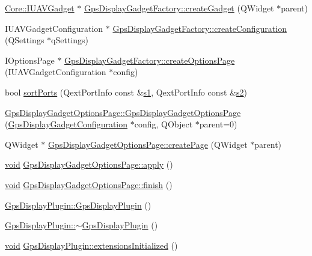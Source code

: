 \begin{DoxyCompactItemize}
\item 
\hyperlink{class_core_1_1_i_u_a_v_gadget}{\-Core\-::\-I\-U\-A\-V\-Gadget} $\ast$ \hyperlink{group___g_p_s_gadget_plugin_gabda9dce6df1e2608e4450ae1573588df}{\-Gps\-Display\-Gadget\-Factory\-::create\-Gadget} (\-Q\-Widget $\ast$parent)
\item 
\-I\-U\-A\-V\-Gadget\-Configuration $\ast$ \hyperlink{group___g_p_s_gadget_plugin_gae66522a3ebff0d0efac6e71ddf729657}{\-Gps\-Display\-Gadget\-Factory\-::create\-Configuration} (\-Q\-Settings $\ast$q\-Settings)
\item 
\-I\-Options\-Page $\ast$ \hyperlink{group___g_p_s_gadget_plugin_gab72aeb74597d8373b64dce43943c9e75}{\-Gps\-Display\-Gadget\-Factory\-::create\-Options\-Page} (\-I\-U\-A\-V\-Gadget\-Configuration $\ast$config)
\item 
bool \hyperlink{group___g_p_s_gadget_plugin_ga6244f67dce3641a662a3c15f4eba081b}{sort\-Ports} (\-Qext\-Port\-Info const \&\hyperlink{_o_p_plots_8m_a2f07e0f444810cc4e54ee2be2ce0ac65}{s1}, \-Qext\-Port\-Info const \&\hyperlink{_o_p_plots_8m_a2e63e71737e8b6802b81f6a7c5ca6a0a}{s2})
\item 
\hyperlink{group___g_p_s_gadget_plugin_ga2cc5111e9489419740cbbfb61043fcd3}{\-Gps\-Display\-Gadget\-Options\-Page\-::\-Gps\-Display\-Gadget\-Options\-Page} (\hyperlink{class_gps_display_gadget_configuration}{\-Gps\-Display\-Gadget\-Configuration} $\ast$config, \-Q\-Object $\ast$parent=0)
\item 
\-Q\-Widget $\ast$ \hyperlink{group___g_p_s_gadget_plugin_gac8c534a784eaab5341c1baf07c5dec0b}{\-Gps\-Display\-Gadget\-Options\-Page\-::create\-Page} (\-Q\-Widget $\ast$parent)
\item 
\hyperlink{group___u_a_v_objects_plugin_ga444cf2ff3f0ecbe028adce838d373f5c}{void} \hyperlink{group___g_p_s_gadget_plugin_gae80bdcce5ad91f0ada2fcf74ee83242a}{\-Gps\-Display\-Gadget\-Options\-Page\-::apply} ()
\item 
\hyperlink{group___u_a_v_objects_plugin_ga444cf2ff3f0ecbe028adce838d373f5c}{void} \hyperlink{group___g_p_s_gadget_plugin_gaa513cdfb1866a8dec9976710811b48cb}{\-Gps\-Display\-Gadget\-Options\-Page\-::finish} ()
\item 
\hyperlink{group___g_p_s_gadget_plugin_ga48d06ebeae3e8a6acb71c7a3c1e8c6c0}{\-Gps\-Display\-Plugin\-::\-Gps\-Display\-Plugin} ()
\item 
\hyperlink{group___g_p_s_gadget_plugin_gaa42f8ee4562f96fdd5e4c384bf7ca1d6}{\-Gps\-Display\-Plugin\-::$\sim$\-Gps\-Display\-Plugin} ()
\item 
\hyperlink{group___u_a_v_objects_plugin_ga444cf2ff3f0ecbe028adce838d373f5c}{void} \hyperlink{group___g_p_s_gadget_plugin_gad0d01fd7addd024c1a5fad7002a7c358}{\-Gps\-Display\-Plugin\-::extensions\-Initialized} ()

\end{DoxyCompactItemize}
